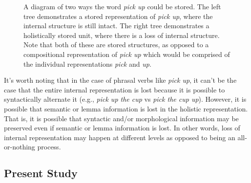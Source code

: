 \documentclass[
  12pt,
  letterpaper,
]{scrreprt}
\begin{document}
\begin{figure}[htbp]

\caption{\label{fig-lossinternalstructure}A diagram of two ways the word
\emph{pick up} could be stored. The left tree demonstrates a stored
representation of \emph{pick up}, where the internal structure is still
intact. The right tree demonstrates a holistically stored unit, where
there is a loss of internal structure. Note that both of these are
stored structures, as opposed to a compositional representation of
\emph{pick up} which would be comprised of the individual
representations \emph{pick} and \emph{up}.}


\end{figure}%

It's worth noting that in the case of phrasal verbs like \emph{pick up},
it can't be the case that the entire internal representation is lost
because it is possible to syntactically alternate it (e.g., \emph{pick
up the cup} vs \emph{pick the cup up}). However, it is possible that
semantic or lemma information is lost in the holistic representation.
That is, it is possible that syntactic and/or morphological information
may be preserved even if semantic or lemma information is lost. In other
words, loss of internal representation may happen at different levels as
opposed to being an all-or-nothing process.

\subsection{Present Study}\label{present-study}
\end{document}
